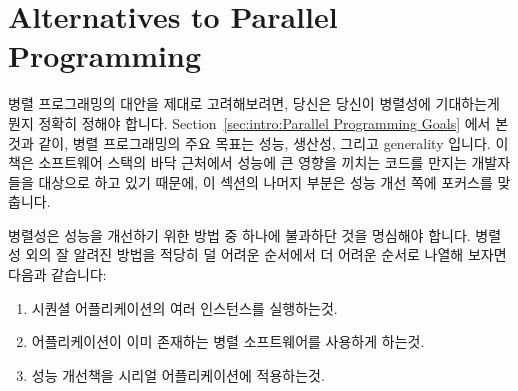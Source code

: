 
\section{Alternatives to Parallel Programming}
\label{sec:intro:Alternatives to Parallel Programming}

병렬 프로그래밍의 대안을 제대로 고려해보려면, 당신은 당신이 병렬성에 기대하는게
뭔지 정확히 정해야 합니다.
Section~\ref{sec:intro:Parallel Programming Goals} 에서 본것과 같이, 병렬
프로그래밍의 주요 목표는 성능, 생산성, 그리고 generality 입니다.
이 책은 소프트웨어 스택의 바닥 근처에서 성능에 큰 영향을 끼치는 코드를 만지는
개발자들을 대상으로 하고 있기 때문에, 이 섹션의 나머지 부분은 성능 개선 쪽에
포커스를 맞춥니다.


병렬성은 성능을 개선하기 위한 방법 중 하나에 불과하단 것을 명심해야 합니다.
병렬성 외의 잘 알려진 방법을 적당히 덜 어려운 순서에서 더 어려운 순서로 나열해
보자면 다음과 같습니다:


\begin{enumerate}
\item	시퀀셜 어플리케이션의 여러 인스턴스를 실행하는것.
\item	어플리케이션이 이미 존재하는 병렬 소프트웨어를 사용하게 하는것.
\item	성능 개선책을 시리얼 어플리케이션에 적용하는것.

\end{enumerate}

